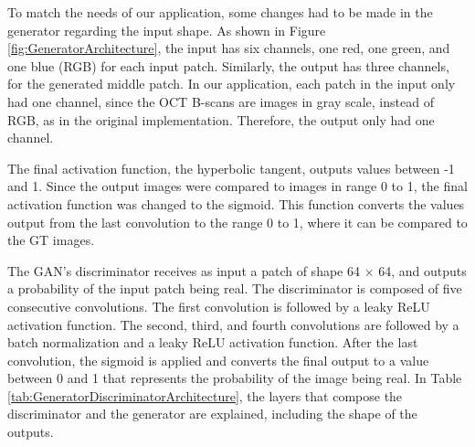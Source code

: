 To match the needs of our application, some changes had to be made in the generator regarding the input shape. As shown in Figure \ref{fig:GeneratorArchitecture}, the input has six channels, one red, one green, and one blue (RGB) for each input patch. Similarly, the output has three channels, for the generated middle patch. In our application, each patch in the input only had one channel, since the OCT B-scans are images in gray scale, instead of RGB, as in the original implementation. Therefore, the output only had one channel. 
\par
The final activation function, the hyperbolic tangent, outputs values between -1 and 1. Since the output images were compared to images in range 0 to 1, the final activation function was changed to the sigmoid. This function converts the values output from the last convolution to the range 0 to 1, where it can be compared to the GT images.
\par
The GAN's discriminator receives as input a patch of shape 64 $\times$ 64, and outputs a probability of the input patch being real. The discriminator is composed of five consecutive convolutions. The first convolution is followed by a leaky ReLU activation function. The second, third, and fourth convolutions are followed by a batch normalization and a leaky ReLU activation function. After the last convolution, the sigmoid is applied and converts the final output to a value between 0 and 1 that represents the probability of the image being real. In Table \ref{tab:GeneratorDiscriminatorArchitecture}, the layers that compose the discriminator and the generator are explained, including the shape of the outputs.

